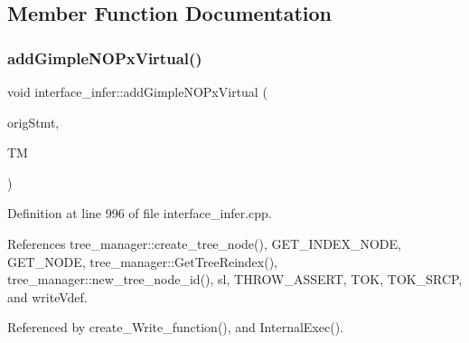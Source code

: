 \subsection{Member Function Documentation}
\mbox{\label{classinterface__infer_aebc13d03184a040770e742f5e9e8320a}} 
\subsubsection{\texorpdfstring{add\+Gimple\+N\+O\+Px\+Virtual()}{addGimpleNOPxVirtual()}}
{\footnotesize\ttfamily void interface\+\_\+infer\+::add\+Gimple\+N\+O\+Px\+Virtual (\begin{DoxyParamCaption}\item[{\hyperlink{tree__node_8hpp_a6ee377554d1c4871ad66a337eaa67fd5}{tree\+\_\+node\+Ref}}]{orig\+Stmt,  }\item[{const \hyperlink{tree__manager_8hpp_a96ff150c071ce11a9a7a1e40590f205e}{tree\+\_\+manager\+Ref}}]{TM }\end{DoxyParamCaption})\hspace{0.3cm}{\ttfamily [private]}}



Definition at line 996 of file interface\+\_\+infer.\+cpp.



References tree\+\_\+manager\+::create\+\_\+tree\+\_\+node(), G\+E\+T\+\_\+\+I\+N\+D\+E\+X\+\_\+\+N\+O\+DE, G\+E\+T\+\_\+\+N\+O\+DE, tree\+\_\+manager\+::\+Get\+Tree\+Reindex(), tree\+\_\+manager\+::new\+\_\+tree\+\_\+node\+\_\+id(), sl, T\+H\+R\+O\+W\+\_\+\+A\+S\+S\+E\+RT, T\+OK, T\+O\+K\+\_\+\+S\+R\+CP, and write\+Vdef.



Referenced by create\+\_\+\+Write\+\_\+function(), and Internal\+Exec().

